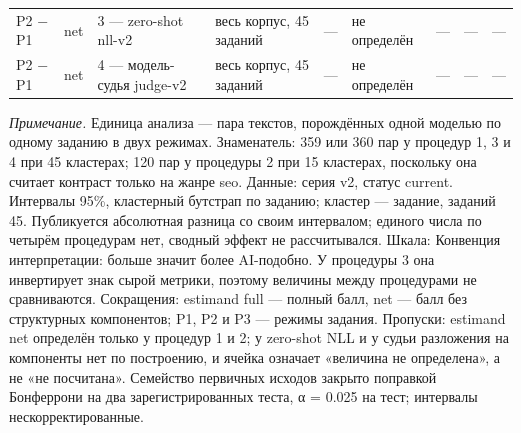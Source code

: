 \begin{table}[htbp]
\begin{tabular}{lllllllll}
P2 − P1 & net & 3 — zero-shot nll-v2 & весь корпус, 45 заданий & — & не определён & — & — & — \\
P2 − P1 & net & 4 — модель-судья judge-v2 & весь корпус, 45 заданий & — & не определён & — & — & — \\
\bottomrule
\end{tabular}
\begin{minipage}{\linewidth}\footnotesize\vspace{2pt}
\textit{Примечание.} Единица анализа — пара текстов, порождённых одной моделью по одному заданию в двух режимах. Знаменатель: 359 или 360 пар у процедур 1, 3 и 4 при 45 кластерах; 120 пар у процедуры 2 при 15 кластерах, поскольку она считает контраст только на жанре seo. Данные: серия v2, статус current. Интервалы 95\%, кластерный бутстрап по заданию; кластер — задание, заданий 45. Публикуется абсолютная разница со своим интервалом; единого числа по четырём процедурам нет, сводный эффект не рассчитывался. Шкала: Конвенция интерпретации: больше значит более AI-подобно. У процедуры 3 она инвертирует знак сырой метрики, поэтому величины между процедурами не сравниваются. Сокращения: estimand full — полный балл, net — балл без структурных компонентов; P1, P2 и P3 — режимы задания. Пропуски: estimand net определён только у процедур 1 и 2; у zero-shot NLL и у судьи разложения на компоненты нет по построению, и ячейка означает «величина не определена», а не «не посчитана». Семейство первичных исходов закрыто поправкой Бонферрони на два зарегистрированных теста, α = 0.025 на тест; интервалы нескорректированные.
\end{minipage}
\end{table}
